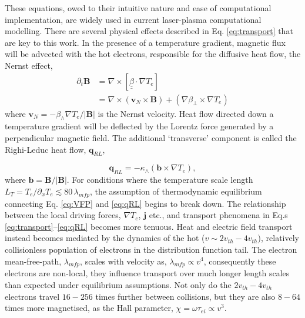 \documentclass[aip,reprint]{revtex4-1}
\begin{document}
These equations, owed to their intuitive nature and ease of computational implementation, are widely used in current laser-plasma computational modelling. There are several physical effects described in Eq. \ref{eq:transport} that are key to this work. In the presence of a temperature gradient, magnetic flux will be advected with the hot electrons, responsible for the diffusive heat flow, the Nernst effect,
\begin{eqnarray}
\partial_t \mathbf{B} &= \nabla \times \left[\underline{\underline{\beta}} \cdot \nabla T_e \right] \\
&=\nabla \times (\mathbf{v}_N \times \mathbf{B})  +  \left(  \nabla \beta_{\perp} \times \nabla T_e\right )
\label{eq:Nernst}
\end{eqnarray}
where $\mathbf{v}_N = - \beta_{\wedge} \nabla T_e/|\mathbf{B}|$ is the Nernst velocity.
 Heat flow directed down a temperature gradient will be deflected by the Lorentz force generated by a perpendicular magnetic field. The additional `transverse' component is called the Righi-Leduc heat flow, $\mathbf{q}_{RL}$,
 
\begin{equation}
\mathbf{q}_{RL}  =-\kappa_{\wedge}(\mathbf{b}\times \nabla T_e), 
\label{eq:qRL}
\end{equation}
where $\mathbf{b} = \mathbf{B}/|\mathbf{B}|$. For conditions where the temperature scale length $L_{T} = T_e/\partial_x T_e \lesssim 80 \, \lambda_{mfp}$, the assumption of thermodynamic equilibrium connecting Eq. \ref{eq:VFP} and \ref{eq:qRL} begins to break down.  The relationship between the local driving forces, $\nabla T_e$, $\mathbf{j}$  etc., and transport phenomena in Eq.s \ref{eq:transport}--\ref{eq:qRL} becomes more tenuous.  Heat and electric field transport instead becomes mediated by the dynamics of the hot ($v\sim 2\si{v_{th}} - 4\si{v_{th}}$), relatively collisionless population of electrons in the distribution function tail. The electron mean-free-path, $\lambda_{mfp}$, scales with velocity as, $\lambda_{mfp} \propto v^4$, consequently these electrons are non-local, they influence transport over much longer length scales than expected under equilibrium assumptions. Not only do the $2\si{v_{th}} - 4\si{v_{th}}$ electrons travel $16-256$ times further between collisions, but they are also $8-64$ times more magnetised, as the Hall parameter, $\chi = \omega \tau_{ei}\propto v^3$.  
 
\end{document}

